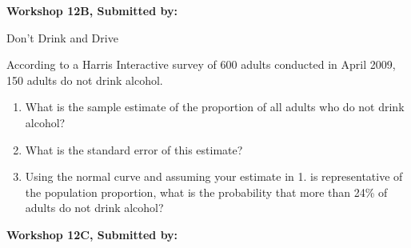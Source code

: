 \documentclass[11pt]{book}\usepackage[]{graphicx}\usepackage[]{color}
\begin{document}
\begin{exercises}
    \begin{exercise}  %

    \begin{center}
\begin{flushleft}\textbf{\large \hfill Workshop 12B, Submitted by: }\end{flushleft}

\end{center}

Don't Drink and Drive

According to a Harris Interactive survey of 600 adults conducted in April 2009, 150 adults do not drink alcohol. 

\begin{enumerate}
  \item What is the sample estimate of the proportion of all adults who do not drink alcohol?
  \item What is the standard error of this estimate?
  \item Using the normal curve and assuming your estimate in 1. is representative of the population proportion, what is the probability that more than 24\% of adults do not drink alcohol?
\end{enumerate}

\end{exercise} 
\begin{solution}  %

\end{solution}

\clearpage

    \begin{exercise}  %

    \begin{center}
\begin{flushleft}\textbf{\large \hfill Workshop 12C, Submitted by: }\end{flushleft}


\end{center}
\end{exercise}
\end{exercises}
\end{document}
